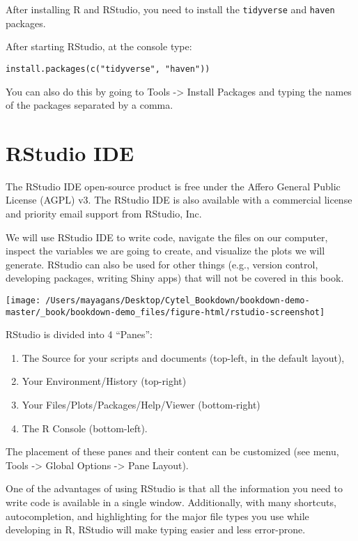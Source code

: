 \documentclass[]{book}
\providecommand{\tightlist}{%
  \setlength{\itemsep}{0pt}\setlength{\parskip}{0pt}}
\begin{document}
After installing R and RStudio, you need to install the
\texttt{tidyverse} and \texttt{haven} packages.

After starting RStudio, at the console type:

\begin{verbatim}
install.packages(c("tidyverse", "haven"))
\end{verbatim}

You can also do this by going to Tools -\textgreater{} Install Packages
and typing the names of the packages separated by a comma.

\chapter{RStudio IDE}\label{intro}

The RStudio IDE open-source product is free under the Affero General
Public License (AGPL) v3. The RStudio IDE is also available with a
commercial license and priority email support from RStudio, Inc.

We will use RStudio IDE to write code, navigate the files on our
computer, inspect the variables we are going to create, and visualize
the plots we will generate. RStudio can also be used for other things
(e.g., version control, developing packages, writing Shiny apps) that
will not be covered in this book.

\texttt{[image: /Users/mayagans/Desktop/Cytel\_Bookdown/bookdown-demo-master/\_book/bookdown-demo\_files/figure-html/rstudio-screenshot]}

RStudio is divided into 4 ``Panes'':

\begin{enumerate}
\def\labelenumi{\arabic{enumi})}
\tightlist
\item
  The Source for your scripts and documents (top-left, in the default
  layout),
\item
  Your Environment/History (top-right)
\item
  Your Files/Plots/Packages/Help/Viewer (bottom-right)
\item
  The R Console (bottom-left).
\end{enumerate}

The placement of these panes and their content can be customized (see
menu, Tools -\textgreater{} Global Options -\textgreater{} Pane Layout).

One of the advantages of using RStudio is that all the information you
need to write code is available in a single window. Additionally, with
many shortcuts, autocompletion, and highlighting for the major file
types you use while developing in R, RStudio will make typing easier and
less error-prone.
\end{document}
